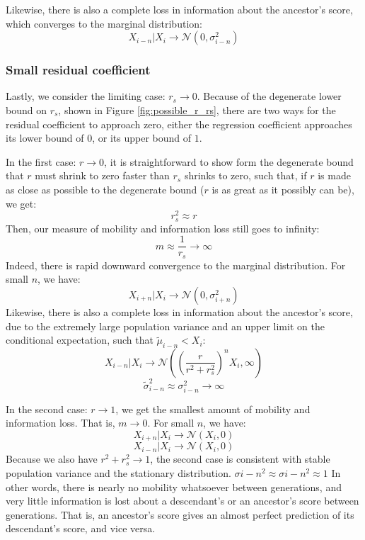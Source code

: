 \documentclass[letterpaper,10pt]{article} %
\begin{document}
Likewise, there is also a complete loss in information about the ancestor's score, which converges to the marginal distribution:
$$X_{i-n}|X_i \rightarrow \mathcal{N}(0, \sigma_{i-n}^2)$$


\subsubsection*{Small residual coefficient}
Lastly, we consider the limiting case: $r_s \rightarrow 0$. Because of the degenerate lower bound on $r_s$, shown in Figure \ref{fig:possible_r_rs}, there are two ways for the residual coefficient to approach zero, either the regression coefficient approaches its lower bound of $0$, or its upper bound of $1$.

In the first case: $r \rightarrow 0$, it is straightforward to show form the degenerate bound that $r$ must shrink to zero faster than $r_s$ shrinks to zero, such that, if $r$ is made as close as possible to the degenerate bound ($r$ is as great as it possibly can be), we get:
$$r_s^2 \approx r$$
Then, our measure of mobility and information loss still goes to infinity:
$$m \approx \frac{1}{r_s} \rightarrow \infty$$
Indeed, there is rapid downward convergence to the marginal distribution. For small $n$, we have:
$$X_{i+n}|X_i \rightarrow \mathcal{N}(0, \sigma_{i+n}^2)$$
Likewise, there is also a complete loss in information about the ancestor's score, due to the extremely large population variance and an upper limit on the conditional expectation, such that $\tilde{\mu}_{i-n} < X_i$:
$$X_{i-n}|X_i \rightarrow \mathcal{N}((\frac{r}{r^2+r_s^2})^n X_i, \infty)$$
$$\tilde{\sigma}_{i-n}^2 \approx \sigma_{i-n}^2 \rightarrow \infty$$


In the second case: $r \rightarrow 1$, we get the smallest amount of mobility and information loss. That is, $m \rightarrow 0$. For small $n$, we have:
$$X_{i+n}|X_i \rightarrow \mathcal{N}(X_i, 0)$$
$$X_{i-n}|X_i \rightarrow \mathcal{N}(X_i, 0)$$
Because we also have $r^2 + r_s^2 \rightarrow 1$, the second case is consistent with stable population variance and the stationary distribution.
$\sigma{i-n}^2 \approx \sigma{i-n}^2 \approx 1$
In other words, there is nearly no mobility whatsoever between generations, and very little information is lost about a descendant's or an ancestor's score between generations. That is, an ancestor's score gives an almost perfect prediction of its descendant's score, and vice versa.




\end{document}
